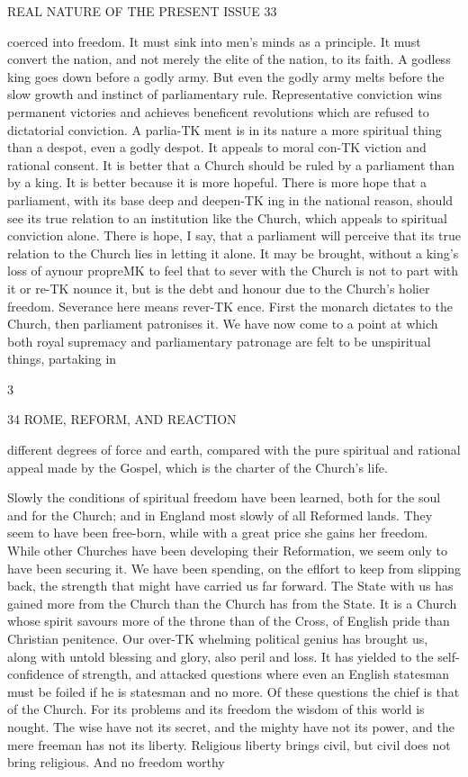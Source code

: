 \documentclass[12pt,a5paper,oneside]{book}
\begin{document}
REAL NATURE OF THE PRESENT ISSUE 33 

coerced into freedom. It must sink into men's minds 
as a principle. It must convert the nation, and not 
merely the elite of the nation, to its faith. A godless 
king goes down before a godly army. But even the 
godly army melts before the slow growth and instinct 
of parliamentary rule. Representative conviction wins 
permanent victories and achieves beneficent revolutions 
which are refused to dictatorial conviction. A parlia-TK
ment is in its nature a more spiritual thing than a 
despot, even a godly despot. It appeals to moral con-TK
viction and rational consent. It is better that a Church 
should be ruled by a parliament than by a king. It 
is better because it is more hopeful. There is more 
hope that a parliament, with its base deep and deepen-TK
ing in the national reason, should see its true relation 
to an institution like the Church, which appeals to 
spiritual conviction alone. There is hope, I say, that 
a parliament will perceive that its true relation to the 
Church lies in letting it alone. It may be brought, 
without a king's loss of aynour propreMK to feel that to 
sever with the Church is not to part with it or re-TK
nounce it, but is the debt and honour due to the 
Church's holier freedom. Severance here means rever-TK
ence. First the monarch dictates to the Church, then 
parliament patronises it. We have now come to a 
point at which both royal supremacy and parliamentary 
patronage are felt to be unspiritual things, partaking in 

3 



34 ROME, REFORM, AND REACTION 

different degrees of force and earth, compared with 
the pure spiritual and rational appeal made by the 
Gospel, which is the charter of the Church's life. 

Slowly the conditions of spiritual freedom have been 
learned, both for the soul and for the Church; and 
in England most slowly of all Reformed lands. They 
seem to have been free-born, while with a great price 
she gains her freedom. While other Churches have 
been developing their Reformation, we seem only to 
have been securing it. We have been spending, on 
the eflfort to keep from slipping back, the strength that 
might have carried us far forward. The State with 
us has gained more from the Church than the Church 
has from the State. It is a Church whose spirit 
savours more of the throne than of the Cross, of 
English pride than Christian penitence. Our over-TK
whelming political genius has brought us, along with 
untold blessing and glory, also peril and loss. It has 
yielded to the self-confidence of strength, and attacked 
questions where even an English statesman must be 
foiled if he is statesman and no more. Of these 
questions the chief is that of the Church. For its 
problems and its freedom the wisdom of this world 
is nought. The wise have not its secret, and the 
mighty have not its power, and the mere freeman has 
not its liberty. Religious liberty brings civil, but 
civil does not bring religious. And no freedom worthy 
\end{document}
